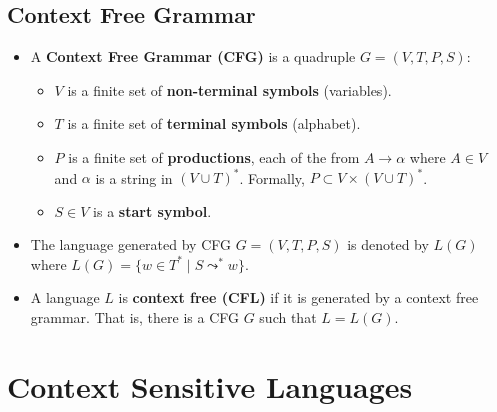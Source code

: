 \subsection{Context Free Grammar}
\begin{itemize}
    \item A \textbf{Context Free Grammar (CFG)} is a quadruple $G = (V, T, P, S)$:
    \begin{itemize}
        \item $V$ is a finite set of \textbf{non-terminal symbols} (variables).
        \item $T$ is a finite set of \textbf{terminal symbols} (alphabet).
        \item $P$ is a finite set of \textbf{productions}, each of the from $A \rightarrow \alpha$ where $A \in V$ and $\alpha$ is a string in $(V \cup T)^{\ast}$. Formally, $P \subset V \times (V \cup T)^{\ast}$.
        \item $S \in V$ is a \textbf{start symbol}.
    \end{itemize}
    \item The language generated by CFG $G = (V, T, P, S)$ is denoted by $L(G)$ where $L(G) = \{ w \in T^{\ast} \mid S \leadsto^{\ast} w \}$.
    \item A language $L$ is \textbf{context free (CFL)} if it is generated by a context free grammar. That is, there is a CFG $G$ such that $L = L(G)$.
\end{itemize}

\section{Context Sensitive Languages}

